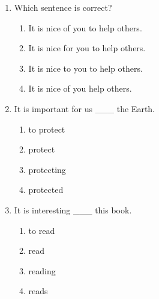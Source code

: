 \documentclass[11pt,a4paper]{ctexart}
\begin{document}
\begin{enumerate}[leftmargin=*,itemsep=4pt]
\begin{enumerate}[label=\Alph*.,leftmargin=2em,itemsep=1pt,topsep=2pt]
\item It is easy to me to solve the problem.
\item It easy for me to solve the problem.
\end{enumerate}
\item Which sentence is correct?
\begin{enumerate}[label=\Alph*.,leftmargin=2em,itemsep=1pt,topsep=2pt]
\item It is nice of you to help others.
\item It is nice for you to help others.
\item It is nice to you to help others.
\item It is nice of you help others.
\end{enumerate}
\item It is important for us \_\_\_ the Earth.
\begin{enumerate}[label=\Alph*.,leftmargin=2em,itemsep=1pt,topsep=2pt]
\item to protect
\item protect
\item protecting
\item protected
\end{enumerate}
\item It is interesting \_\_\_ this book.
\begin{enumerate}[label=\Alph*.,leftmargin=2em,itemsep=1pt,topsep=2pt]
\item to read
\item read
\item reading
\item reads
\end{enumerate}
\end{enumerate}
\end{document}
